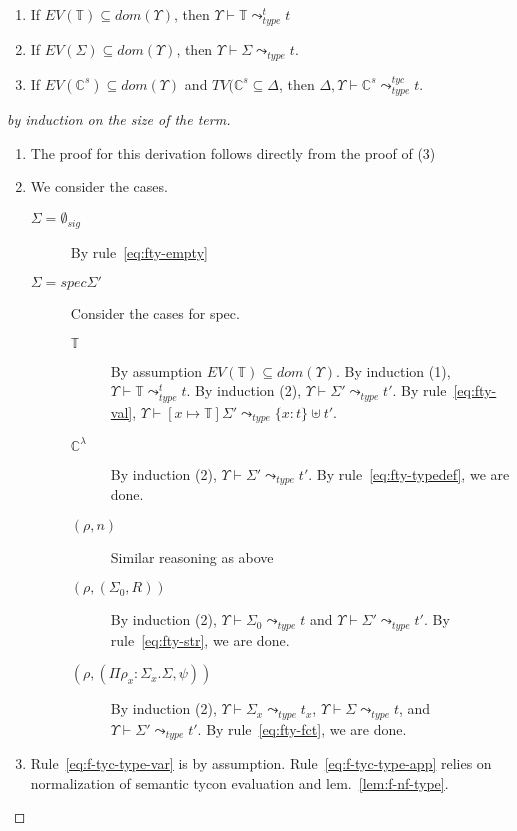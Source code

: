 \begin{lemma}\label{lem:closedsemtypes}
\begin{enumerate}
\item If $EV(\mathbb{T})\subseteq dom(\Upsilon)$, then $\Upsilon\vdash
\mathbb{T} \leadsto^t_{type} t$

\item If $EV(\Sigma)\subseteq dom(\Upsilon)$, then
$\Upsilon\vdash\Sigma\leadsto_{type} t$. 

\item If $EV(\mathbb{C}^s) \subseteq dom(\Upsilon)$ and
  $TV(\mathbb{C}^s\subseteq \Delta$, then
  $\Delta,\Upsilon\vdash\mathbb{C}^s \leadsto^{tyc}_{type} t$. 

\end{enumerate}
\end{lemma}
\begin{proof}[by induction on the size of the term]
\begin{enumerate}
\item The proof for this derivation follows directly from the proof of (3)
\item We consider the cases.
\begin{description}
\item[$\Sigma=\emptyset_{sig}$] By rule~\ref{eq:fty-empty}
\item[$\Sigma=spec\Sigma'$] 
    Consider the cases for spec.
    \begin{description}
      \item[$\mathbb{T}$] By assumption $EV(\mathbb{T})\subseteq
        dom(\Upsilon)$. By induction (1), $\Upsilon\vdash \mathbb{T}
        \leadsto^t_{type} t$. By induction (2), $\Upsilon\vdash
        \Sigma'\leadsto_{type} t'$. 
By rule~\ref{eq:fty-val}, $\Upsilon\vdash[x\mapsto\mathbb{T}]\Sigma'
\leadsto_{type} \{x:t\}\uplus t'$. 
        \item[$\mathbb{C}^\lambda$] By induction (2),
          $\Upsilon\vdash\Sigma'\leadsto_{type} t'$. By
          rule~\ref{eq:fty-typedef}, we are done.
        \item[$(\rho,n)$] Similar reasoning as above
        \item[$(\rho,(\Sigma_0,R))$] By induction (2),
          $\Upsilon\vdash\Sigma_0\leadsto_{type} t$ and
          $\Upsilon\vdash\Sigma'\leadsto_{type} t'$. By
          rule~\ref{eq:fty-str}, we are done.
        \item[$(\rho,(\Pi\rho_x:\Sigma_x.\Sigma,\psi))$] By induction
          (2), $\Upsilon\vdash\Sigma_x\leadsto_{type} t_x$,
          $\Upsilon\vdash\Sigma\leadsto_{type} t$, and
          $\Upsilon\vdash\Sigma'\leadsto_{type} t'$. By
          rule~\ref{eq:fty-fct}, we are done. 
    \end{description}

\end{description}
\item Rule~\ref{eq:f-tyc-type-var} is by
  assumption. Rule~\ref{eq:f-tyc-type-app} relies on normalization of
  semantic tycon evaluation and lem.~\ref{lem:f-nf-type}. 
\end{enumerate}
\end{proof}

